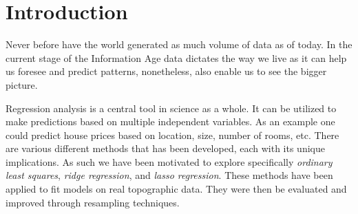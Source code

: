 \documentclass[aps,rmp,reprint,amsmath,amssymb,graphicx,longbibliography]{revtex4-1}
\begin{document}
\maketitle
\def\thefootnote{*}\def\thefootnote{\arabic{footnote}}
\def\thefootnote{$^1$}

\tableofcontents







\begin{comment}
    The report, the introduction

When you write the introduction you could focus on the following aspects

    Motivate the reader, the first part of the introduction gives always a motivation and tries to give the overarching ideas
    What I have done
    The structure of the report, how it is organized etc

\end{comment}

\section{Introduction}

    Never before have the world generated as much volume of data as of today. In the current stage of the Information Age data dictates the way we live as it can help us foresee and predict patterns, nonetheless, also enable us to see the bigger picture.


    
Regression analysis is a central tool in science as a whole. It can be utilized to make predictions based on multiple independent variables. As an example one could predict house prices based on location, size, number of rooms, etc. There are various different methods that has been developed, each with its unique implications. As such we have been motivated to explore specifically \textit{ordinary least squares}, \textit{ridge regression}, and \textit{lasso regression}. These methods have been applied to fit models on real topographic data. They were then be evaluated and improved through resampling techniques.
\end{document}
